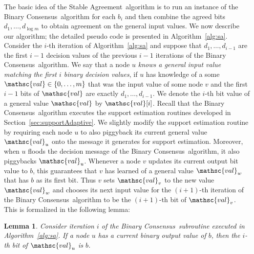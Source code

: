 \documentclass[leqno,11pt]{article}
\newtheorem{lemma}[theorem]{Lemma}
\newcommand{\val}{{\mathsc{val}}}
\newcommand{\sa}{{\sc Stable Agreement}}
\newcommand{\bc}{{\sc Binary Consensus}}
\begin{document}
The basic idea of the \sa\ algorithm is to run an instance of the \bc\ algorithm
for each $b_i$ and then combine the agreed bits $d_1,\dots,d_{\log m}$ to obtain agreement on the
general input values. We now describe our algorithm; the detailed pseudo code is
presented in Algorithm~\ref{alg:sa}.
Consider the $i$-th iteration of Algorithm~\ref{alg:sa} and suppose that $d_1,\dots,d_{i-1}$ are the first $i-1$ decision values of the previous $i-1$ iterations of the \bc\ algorithm.
We say that a node $u$ \emph{knows a general input value matching the first $i$ binary decision values}, if $u$ has knowledge of a some $\val \in \{0,\dots,m\}$ that was the input value of some node $v$ and the first $i-1$ bits of $\val$ are exactly $d_1,\dots,d_{i-1}$.
We denote the $i$-th bit value of a general value $\val$ by $\val[i]$.
Recall that the \bc\ algorithm executes the support estimation routines developed in Section~\ref{sec:supportAdaptive}.
We slightly modify the support estimation routine by requiring each node $u$ to also piggyback its current general value $\val_u$ onto the message it generates for support estimation.
Moreover, when $u$ floods the decision message of the \bc\ algorithm, it also piggybacks $\val_u$.
Whenever a node $v$ updates its current output bit value to $b$, this guarantees that $v$ has learned of a general value $\val_w$ that has $b$ as its first bit.
Thus $v$ sets $\val_v$ to the new value $\val_w$ and chooses its next input value for the $(i+1)$-th iteration of the \bc\ algorithm to be the $(i+1)$-th bit of $\val_v$.
This is formalized in the following lemma:
\begin{lemma} \label{lem:validity}
  Consider iteration $i$ of the \bc\ subroutine executed in Algorithm~\ref{alg:sa}.
  If a node $u$ has a current binary output value of $b$, then the $i$-th bit of $\val_u$ is $b$.
\end{lemma}
\end{document}
